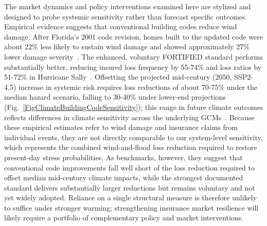 \documentclass[fleqn,10pt]{wlscirep}
\begin{document}
The market dynamics and policy interventions examined here are stylized and designed to probe systemic sensitivity rather than forecast specific outcomes. Empirical evidence suggests that conventional building codes reduce wind damage. After Florida's 2001 code revision, homes built to the updated code were about 22\% less likely to sustain wind damage and showed approximately 27\% lower damage severity~\cite{wolf_are_2025}. The enhanced, voluntary FORTIFIED standard performs substantially better, reducing insured loss frequency by 55-74\% and loss ratios by 51-72\% in Hurricane Sally~\cite{fortified_sally_2025}. Offsetting the projected mid-century (2050, SSP2-4.5) increase in systemic risk requires loss reductions of about 70-75\% under the median hazard scenario, falling to 30-40\% under lower-end projections (Fig.~\ref{FigClimateBuildingCodeSensitivity}); this range in future climate outcomes reflects differences in climate sensitivity across the underlying GCMs~\cite{meiler_uncertainties_2023}. Because these empirical estimates refer to wind damage and insurance claims from individual events, they are not directly comparable to our system-level sensitivity, which represents the combined wind-and-flood loss reduction required to restore present-day stress probabilities. As benchmarks, however, they suggest that conventional code improvements fall well short of the loss reduction required to offset median mid-century climate impacts, while the strongest documented standard delivers substantially larger reductions but remains voluntary and not yet widely adopted. Reliance on a single structural measure is therefore unlikely to suffice under stronger warming; strengthening insurance market resilience will likely require a portfolio of complementary policy and market interventions. \medskip
\end{document}
